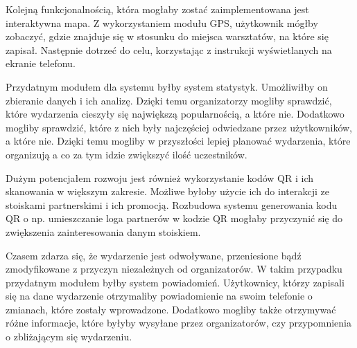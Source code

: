 Kolejną funkcjonalnością, która mogłaby zostać zaimplementowana jest interaktywna mapa. Z wykorzystaniem modułu GPS, użytkownik mógłby zobaczyć, gdzie znajduje się w stosunku do miejsca warsztatów, na które się zapisał. Następnie dotrzeć do celu, korzystając z instrukcji wyświetlanych na ekranie telefonu.

Przydatnym modułem dla systemu byłby system statystyk. Umożliwiłby on zbieranie danych i ich analizę. Dzięki temu organizatorzy mogliby sprawdzić, które wydarzenia cieszyły się największą popularnością, a które nie. Dodatkowo mogliby sprawdzić, które z nich były najczęściej odwiedzane przez użytkowników, a które nie. Dzięki temu mogliby w przyszłości lepiej planować wydarzenia, które organizują a co za tym idzie zwiększyć ilość uczestników.

Dużym potencjałem rozwoju jest również wykorzystanie kodów QR i ich skanowania w większym zakresie. Możliwe byłoby użycie ich do interakcji ze stoiskami partnerskimi i ich promocją. Rozbudowa systemu generowania kodu QR o np. umieszczanie loga partnerów w kodzie QR mogłaby przyczynić się do zwiększenia zainteresowania danym stoiskiem.

Czasem zdarza się, że wydarzenie jest odwoływane, przeniesione bądź zmodyfikowane z przyczyn niezależnych od organizatorów. W takim przypadku przydatnym modułem byłby system powiadomień. Użytkownicy, którzy zapisali się na dane wydarzenie otrzymaliby powiadomienie na swoim telefonie o zmianach, które zostały wprowadzone. Dodatkowo mogliby także otrzymywać różne informacje, które byłyby wysyłane przez organizatorów, czy przypomnienia o zbliżającym się wydarzeniu.